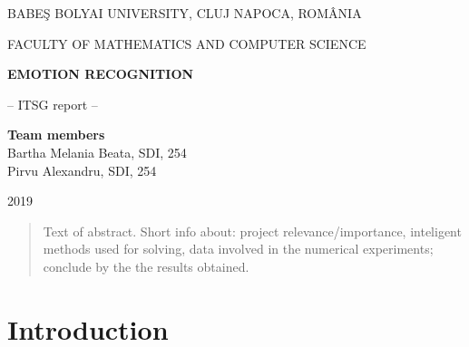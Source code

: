 \documentclass[runningheads,a4paper,11pt]{report}
\begin{document}
\begin{titlepage}
\sloppy
\begin{center}
BABE\c S BOLYAI UNIVERSITY, CLUJ NAPOCA, ROM\^ ANIA

FACULTY OF MATHEMATICS AND COMPUTER SCIENCE

\vspace{6cm}

\Huge \textbf{EMOTION RECOGNITION}

\vspace{1cm}

\normalsize -- ITSG report --

\end{center}


\vspace{5cm}

\begin{flushright}
\Large{\textbf{Team members}}\\
Bartha Melania Beata, SDI, 254\\
Pirvu Alexandru, SDI, 254
\end{flushright}

\vspace{4cm}

\begin{center}
2019
\end{center}

\end{titlepage}


\begin{abstract}
	Text of abstract. Short info about: project relevance/importance, inteligent methods used for solving, data involved in the numerical experiments; conclude by the the results obtained.
\end{abstract}


\tableofcontents

\newpage

\listoftables
\listoffigures
\listofalgorithms

\newpage




\newpage



 


\chapter{Introduction}
\label{chapter:introduction}
\end{document}
